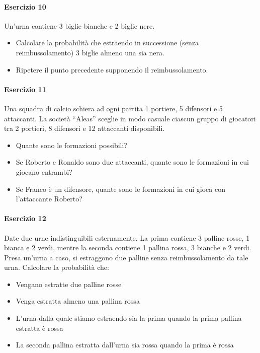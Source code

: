 \documentclass[12pt]{article}
\begin{document}
    \paragraph{Esercizio 10}
    Un'urna contiene 3 biglie bianche e 2 biglie nere.
    \begin{itemize}
        \item Calcolare la probabilità che estraendo in successione (senza reimbussolamento) 3 biglie almeno una sia nera.
        \item Ripetere il punto precedente supponendo il reimbussolamento.
    \end{itemize}
    \paragraph{Esercizio 11}
    Una squadra di calcio schiera ad ogni partita 1 portiere, 5 difensori e 5 attaccanti.
    La società “Aleas” sceglie in modo casuale ciascun gruppo di giocatori tra 2 portieri, 8 difensori e 12 attaccanti disponibili.
    \begin{itemize}
        \item Quante sono le formazioni possibili?
        \item Se Roberto e Ronaldo sono due attaccanti, quante sono le formazioni in cui giocano entrambi?
        \item Se Franco è un difensore, quante sono le formazioni in cui gioca con l’attaccante Roberto?
    \end{itemize}
    \paragraph{Esercizio 12}
    Date due urne indistinguibili esternamente. La prima contiene 3 palline rosse, 1 bianca e 2 verdi, mentre la seconda contiene 1 pallina rossa, 3 bianche e 2 verdi. Presa un’urna a caso, si estraggono due palline senza reimbussolamento da tale urna. Calcolare la probabilità che:
    \begin{itemize}
        \item Vengano estratte due palline rosse
        \item Venga estratta almeno una pallina rossa
        \item L’urna dalla quale stiamo estraendo sia la prima quando la prima pallina estratta è rossa
        \item La seconda pallina estratta dall’urna sia rossa quando la prima è rossa
    \end{itemize}
\end{document}
